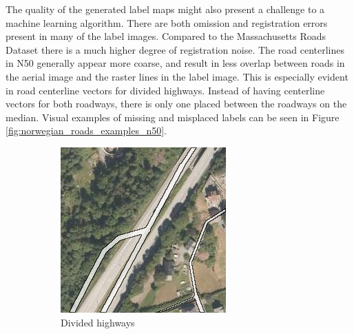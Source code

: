 The quality of the generated label maps might also present a challenge to a machine learning algorithm. There are both omission and registration errors present in many of the label images. Compared to the Massachusetts Roads Dataset there is a much higher degree of registration noise. The road centerlines in N50 generally appear more coarse, and result in less overlap between roads in the aerial image and the raster lines in the label image. This is especially evident in road centerline vectors for divided highways. Instead of having centerline vectors for both roadways, there is only one placed between the roadways on the median. Visual examples of missing and misplaced labels can be seen in Figure \ref{fig:norwegian_roads_examples_n50}.\\

\begin{figure}[h]
\begin{subfigure}{0.31\textwidth}
\includegraphics[width=\linewidth]{figs/datasets/nor_examples/1191_highway_n50.png}
\caption{Divided highways} \label{fig:norwegian_roads_highway_n50}
\end{subfigure}
\hspace*{\fill} %
\begin{subfigure}{0.31\textwidth}

\end{subfigure}
\end{figure}
